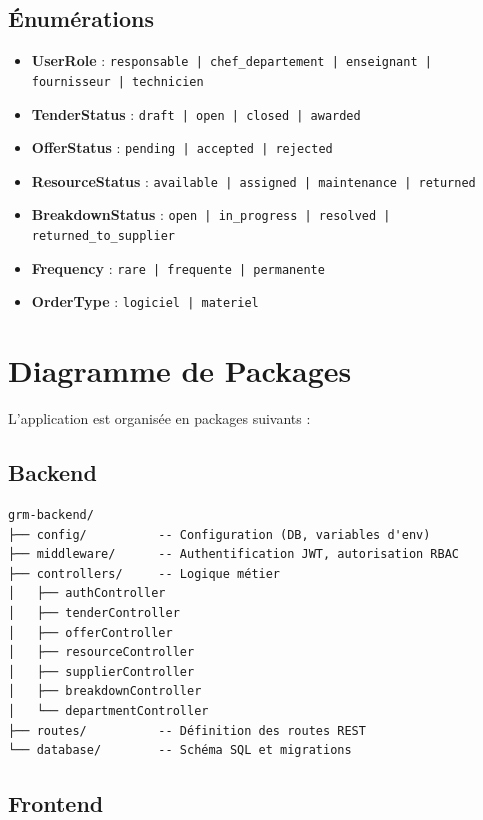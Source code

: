 \subsection{Énumérations}

\begin{itemize}
    \item \textbf{UserRole} : \texttt{responsable | chef\_departement | enseignant | fournisseur | technicien}
    \item \textbf{TenderStatus} : \texttt{draft | open | closed | awarded}
    \item \textbf{OfferStatus} : \texttt{pending | accepted | rejected}
    \item \textbf{ResourceStatus} : \texttt{available | assigned | maintenance | returned}
    \item \textbf{BreakdownStatus} : \texttt{open | in\_progress | resolved | returned\_to\_supplier}
    \item \textbf{Frequency} : \texttt{rare | frequente | permanente}
    \item \textbf{OrderType} : \texttt{logiciel | materiel}
\end{itemize}

\section{Diagramme de Packages}

L'application est organisée en packages suivants :

\subsection{Backend}

\begin{verbatim}
grm-backend/
├── config/          -- Configuration (DB, variables d'env)
├── middleware/      -- Authentification JWT, autorisation RBAC
├── controllers/     -- Logique métier
│   ├── authController
│   ├── tenderController
│   ├── offerController
│   ├── resourceController
│   ├── supplierController
│   ├── breakdownController
│   └── departmentController
├── routes/          -- Définition des routes REST
└── database/        -- Schéma SQL et migrations
\end{verbatim}

\subsection{Frontend}

